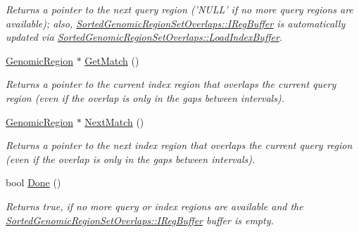 \begin{CompactItemize}
\begin{CompactList}\small\item\em Returns a pointer to the next query region ('NULL' if no more query regions are available); also, \hyperlink{classSortedGenomicRegionSetOverlaps_19fa18e6abd9f045786698fff48a445f}{SortedGenomicRegionSetOverlaps::IRegBuffer} is automatically updated via \hyperlink{classSortedGenomicRegionSetOverlaps_d894d118c61c3cd11be8b37b8f185120}{SortedGenomicRegionSetOverlaps::LoadIndexBuffer}. \item\end{CompactList}\item 
\hypertarget{classSortedGenomicRegionSetOverlaps_d0f7b48e1eb685f0aa62aa799088dbc7}{
\hyperlink{classGenomicRegion}{GenomicRegion} $\ast$ \hyperlink{classSortedGenomicRegionSetOverlaps_d0f7b48e1eb685f0aa62aa799088dbc7}{GetMatch} ()}
\label{classSortedGenomicRegionSetOverlaps_d0f7b48e1eb685f0aa62aa799088dbc7}

\begin{CompactList}\small\item\em Returns a pointer to the current index region that overlaps the current query region (even if the overlap is only in the gaps between intervals). \item\end{CompactList}\item 
\hypertarget{classSortedGenomicRegionSetOverlaps_756bad7ba9a862ae27cd9ad52acbeef2}{
\hyperlink{classGenomicRegion}{GenomicRegion} $\ast$ \hyperlink{classSortedGenomicRegionSetOverlaps_756bad7ba9a862ae27cd9ad52acbeef2}{NextMatch} ()}
\label{classSortedGenomicRegionSetOverlaps_756bad7ba9a862ae27cd9ad52acbeef2}

\begin{CompactList}\small\item\em Returns a pointer to the next index region that overlaps the current query region (even if the overlap is only in the gaps between intervals). \item\end{CompactList}\item 
\hypertarget{classSortedGenomicRegionSetOverlaps_726105d1ee63db6271a90e8092e243c9}{
bool \hyperlink{classSortedGenomicRegionSetOverlaps_726105d1ee63db6271a90e8092e243c9}{Done} ()}
\label{classSortedGenomicRegionSetOverlaps_726105d1ee63db6271a90e8092e243c9}

\begin{CompactList}\small\item\em Returns true, if no more query or index regions are available and the \hyperlink{classSortedGenomicRegionSetOverlaps_19fa18e6abd9f045786698fff48a445f}{SortedGenomicRegionSetOverlaps::IRegBuffer} buffer is empty. \item\end{CompactList}\end{CompactItemize}
